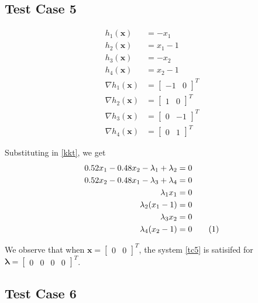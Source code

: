 \documentclass[a4paper]{article}
\newcommand{\numberthis}{\addtocounter{equation}{1}\tag{\theequation}}
\newcommand{\labeleqn}[1]{\numberthis \label{#1}}
\begin{document}
\subsection{Test Case 5}

\begin{align*}
h_1(\textbf{x}) &= - x_1 \\
h_2(\textbf{x}) &= x_1 - 1 \\
h_3(\textbf{x}) &= - x_2 \\
h_4(\textbf{x}) &= x_2 - 1 \\
\nabla h_1(\textbf{x}) &= \begin{bmatrix} -1 & 0 \end{bmatrix} ^T \\
\nabla h_2(\textbf{x}) &= \begin{bmatrix} 1 & 0 \end{bmatrix} ^T \\
\nabla h_3(\textbf{x}) &= \begin{bmatrix} 0 & -1 \end{bmatrix} ^T \\
\nabla h_4(\textbf{x}) &= \begin{bmatrix} 0 & 1 \end{bmatrix} ^T
\end{align*}

Substituting in \eqref{kkt}, we get
\begin{align*}
0.52 x_1 - 0.48 x_2 - \lambda_1 + \lambda_2 &= 0 \\
0.52 x_2 - 0.48 x_1 - \lambda_3 + \lambda_4 &= 0 \\
\lambda_1 x_1 &= 0 \\
\lambda_2 (x_1 - 1) &= 0 \\
\lambda_3 x_2 &= 0 \\
\lambda_4 (x_2 - 1) &= 0 \labeleqn{tc5}
\end{align*}

We observe that when $\textbf{x} = \begin{bmatrix} 0 & 0 \end{bmatrix} ^T$, the system \eqref{tc5} is satisifed for $\boldsymbol{\lambda} = \begin{bmatrix} 0 & 0 & 0 & 0 \end{bmatrix} ^T$.

\subsection{Test Case 6}
\end{document}
